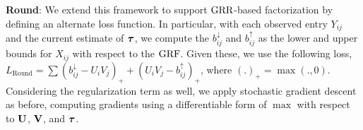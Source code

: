 \documentclass{article}
\newcommand{\sameer}[1]{\todo[color=blue!20]{\textbf{s:} #1}{}}
\newcommand{\para}[1]{\vspace{2mm}\noindent\textbf{#1}:}
\begin{document}


\para{Round}
We extend this framework to support $\text{GRR}$-based factorization by defining an alternate loss function. 
In particular, with each observed entry $Y_{ij}$ and the current estimate of ${\boldsymbol{\tau}}$, we compute the $b_{ij}^\downarrow$ and $b_{ij}^\uparrow$ as the lower and upper bounds for $X_{ij}$ with respect to the $\text{GRF}$.
Given these, we use the following loss, $L_{\text{Round}}=\sum (b_{ij}^\downarrow - U_iV_j)_++( U_iV_j - b_{ij}^\uparrow)_+$, where $(.)_+=\max(.,0)$. Considering the regularization term as well, we apply stochastic gradient descent as before, computing gradients using a differentiable form of $\max$ with respect to $\mathbf{U}$, $\mathbf{V}$, and ${\boldsymbol{\tau}}$.
\end{document}

